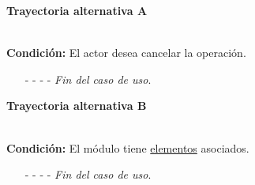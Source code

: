 \hypertarget{CU5-3:TAA}{\textbf{Trayectoria alternativa A}}\\
\noindent \textbf{Condición:} El actor desea cancelar la operación.
\begin{enumerate}
	\UCpaso[\UCactor] Solicita cancelar la operación oprimiendo el botón  del mensaje emergente .
	\UCpaso[\UCsist] Muestra la pantalla .
	\item[- -] - - {\em {Fin del caso de uso}}.%
\end{enumerate}

\hypertarget{CU5-3:TAB}{\textbf{Trayectoria alternativa B}}\\
\noindent \textbf{Condición:} El módulo tiene \hyperlink{tElemento}{elementos} asociados.
\begin{enumerate}
	\UCpaso[\UCsist] Muestra el mensaje  en la pantalla .
	\item[- -] - - {\em {Fin del caso de uso}}.%
\end{enumerate}
	

